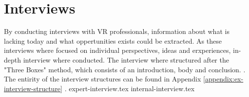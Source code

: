 \section{Interviews}
By conducting interviews with VR professionals, information about what is lacking today and what oppertunities exists could be extracted. As these interviews where focused on individual perspectives, ideas and erxperiences, in-depth interview where conducted.
\cite{interview:Boyce2006} The interview where structured after the "Three Boxes" method, which consists of an introduction, body and conclusion. \cite{interview:Hall2013}. The entirity of the interview structures can be found in Appendix \ref{appendix:ex-interview-structure} .
{expert-interview.tex}
{internal-interview.tex}
